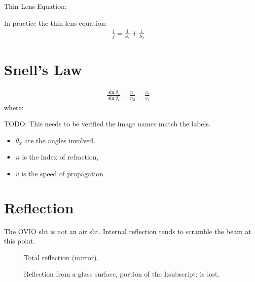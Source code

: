 \documentclass[letterpaper,10pt,english,openany,oneside]{sphinxmanual}
\begin{document}
\sphinxAtStartPar
Thin Lens Equation:

\sphinxAtStartPar
In practice the thin lens equation:
\begin{equation}\label{equation:physics:thinlens}
\begin{split}\frac{1}{f} = \frac{1}{S_1} + \frac{1}{S_2}\end{split}
\end{equation}

\section{Snell’s Law}
\label{\detokenize{physics:snell-s-law}}\begin{equation*}
\begin{split}\frac{\sin\theta_2}{\sin\theta_1} =  \frac{n_1}{n_2}
 =\frac{v_2}{v_1}\end{split}
\end{equation*}
\sphinxAtStartPar
where:

\sphinxAtStartPar
TODO: This needs to be verified the image names match the labels.
\begin{itemize}
\item {} 
\sphinxAtStartPar
\(\theta_x\) are the angles involved.

\item {} 
\sphinxAtStartPar
\(n\)  is the index of refraction,

\item {} 
\sphinxAtStartPar
\(v\)  is the speed of propagation

\end{itemize}


\section{Reflection}
\label{\detokenize{physics:reflection}}
\sphinxAtStartPar
The OVIO slit is not an air slit. Internal reflection
tends to scramble the beam at this point.

\begin{figure}[htbp]
\centering
\capstart

\noindent{}
\caption{Total reflection (mirror).}\label{\detokenize{physics:id3}}\end{figure}

\begin{figure}[htbp]
\centering
\capstart

\noindent{}
\caption{Reflection from a glass surface, portion of the I:subscript: is lost.}\label{\detokenize{physics:id4}}\end{figure}
\end{document}
